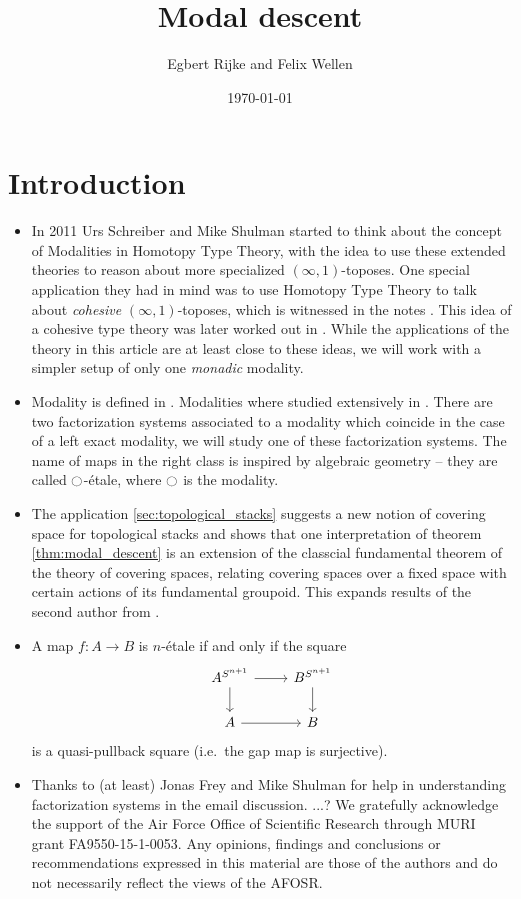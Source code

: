 \documentclass[9pt,twosided]{amsart}
\title{Modal descent}
\author{Egbert Rijke and Felix Wellen}
\date{\today}
\begin{document}
\maketitle

\section{Introduction}
\begin{itemize}
\item In 2011 Urs Schreiber and Mike Shulman started to think about the concept of Modalities in Homotopy Type Theory,
  with the idea to use these extended theories to reason about more specialized $(\infty,1)$-toposes.
  One special application they had in mind was to use Homotopy Type Theory to talk about \emph{cohesive} $(\infty,1)$-toposes,
  which is witnessed in the notes \cite{ShulmanSchreiber}.
  This idea of a cohesive type theory was later worked out in \cite{ShulmanRealCohesion}.
  While the applications of the theory in this article are at least close to these ideas,
  we will work with a simpler setup of only one \emph{monadic} modality.
\item Modality is defined in \cite[Section 7.7]{UFP}.
  Modalities where studied extensively in \cite{RijkeSpittersShulman}.
  There are two factorization systems associated to a modality which coincide in the case of a left exact modality,
  we will study one of these factorization systems. The name of maps in the right class is inspired by algebraic geometry -- they are called ${\ocircle}$-étale,
  where ${\ocircle}$ is the modality.
\item The application \ref{sec:topological_stacks} suggests a new notion of covering space for topological stacks and shows that
  one interpretation of theorem \ref{thm:modal_descent} is an extension of the classcial fundamental theorem of the theory of covering spaces,
  relating covering spaces over a fixed space with certain actions of its fundamental groupoid.
  This expands results of the second author from \cite{wellen-oxford-abstract}.
\item A map $f:A\to B$ is $n$-\'etale if and only if the square
  \begin{equation*}
    \begin{tikzcd}
      A^{\sphere{n+1}} \arrow[r] \arrow[d] & B^{\sphere{n+1}} \arrow[d] \\
      A \arrow[r] & B
    \end{tikzcd}
  \end{equation*}
  is a quasi-pullback square (i.e.~the gap map is surjective).
\item Thanks to (at least) Jonas Frey and Mike Shulman for help in understanding factorization systems in the email discussion.
  ...?
  We gratefully acknowledge the support of the Air Force Office of Scientific Research through MURI grant FA9550-15-1-0053. Any opinions, findings and conclusions or recommendations expressed in this material are those of the authors and do not necessarily reflect the views of the AFOSR.
\end{itemize}
\end{document}
